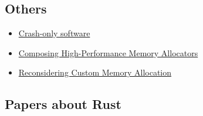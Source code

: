 \subsection{Others}

\begin{itemize}
  \item{\href{https://www.usenix.org/legacy/events/hotos03/tech/full\_papers/candea/candea.pdf}{Crash-only software}}
  \item{\href{http://people.cs.umass.edu/\%7Eemery/pubs/berger-pldi2001.pdf}{Composing High-Performance Memory Allocators}}
  \item{\href{http://people.cs.umass.edu/\%7Eemery/pubs/berger-oopsla2002.pdf}{Reconsidering Custom Memory Allocation}}
\end{itemize}

\subsection{Papers about Rust}

